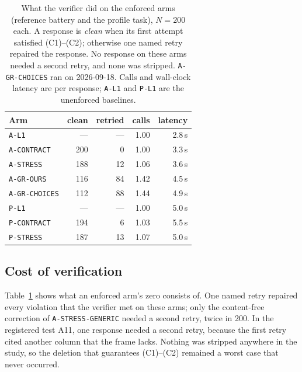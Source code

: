 \documentclass[journal]{IEEEtran}
\begin{document}
\begin{table}[!htbp]
\caption{What the verifier did on the enforced arms (reference battery and
the profile task), $N=200$ each. A response is \emph{clean} when its first
attempt satisfied (C1)--(C2); otherwise one named retry repaired the
response. No
response on these arms needed a second retry, and none was stripped.
\texttt{A-GR-CHOICES} ran on 2026-09-18. Calls and wall-clock
latency are per response; \texttt{A-L1} and \texttt{P-L1} are the unenforced
baselines.}
\label{tab:retry}
\centering
\footnotesize
\setlength{\tabcolsep}{4pt}
\begin{tabular}{@{}lrrrr@{}}
\toprule
Arm & clean & retried & calls & latency \\
\midrule
\texttt{A-L1}         & ---  & ---  & 1.00 & 2.8\,s \\
\texttt{A-CONTRACT}   & 200  &   0  & 1.00 & 3.3\,s \\
\texttt{A-STRESS}     & 188  &  12  & 1.06 & 3.6\,s \\
\texttt{A-GR-OURS}    & 116  &  84  & 1.42 & 4.5\,s \\
\texttt{A-GR-CHOICES} & 112  &  88  & 1.44 & 4.9\,s \\
\midrule
\texttt{P-L1}         & ---  & ---  & 1.00 & 5.0\,s \\
\texttt{P-CONTRACT}   & 194  &   6  & 1.03 & 5.5\,s \\
\texttt{P-STRESS}     & 187  &  13  & 1.07 & 5.0\,s \\
\bottomrule
\end{tabular}
\end{table}

\subsection{Cost of verification}

Table~\ref{tab:retry} shows what an enforced arm's zero consists of. One named
retry repaired every violation that the verifier met on these arms; only the
content-free correction of \texttt{A-STRESS-GENERIC} needed a second retry,
twice in 200. In the registered test A11, one response needed a second retry,
because the first retry cited another column that the frame lacks. Nothing was stripped anywhere in the study, so the deletion that
guarantees (C1)--(C2) remained a worst case that never occurred.
\end{document}
